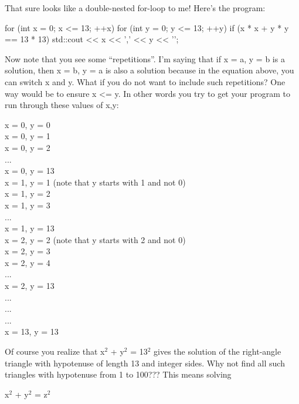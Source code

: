 That sure looks like a double-nested for-loop to me!
Here's the program:
\begin{console}
for (int x = 0; x <= 13; ++x)
{   
    for (int y = 0; y <= 13; ++y)
    {
        if (x * x + y * y == 13 * 13)
        {  
           std::cout << x << ',' << y << '\n';
        }
    }
}
\end{console}
Now note that you see some ``repetitions''. I'm saying
that if x = a, y = b is a solution, then x = b, y = a is also a solution
because in the equation above, you can switch x and y. What if you do
not want to include such repetitions? One way would be to ensure x
<= y. In other words you try to get your program to run through
these values of x,y:

x = 0, y = 0\\
x = 0, y = 1\\
x = 0, y = 2\\
...\\
x = 0, y = 13\\
x = 1, y = 1 (note that y starts with 1 and not 0)\\
x = 1, y = 2\\
x = 1, y = 3\\
...\\
x = 1, y = 13\\
x = 2, y = 2 (note that y starts with 2 and not 0)\\
x = 2, y = 3\\
x = 2, y = 4\\
...\\
x = 2, y = 13\\
...\\
...\\
...\\
x = 13, y = 13\\
Of course you realize that x$^2$ + y$^2$ = 13$^2$ gives the solution of the right-angle triangle with hypotenuse of length 13 and integer sides. Why not find all such triangles with hypotenuse from 1 to 100??? This means solving

\begin{center}
x$^2$ + y$^2$ = z$^2$
\end{center}

